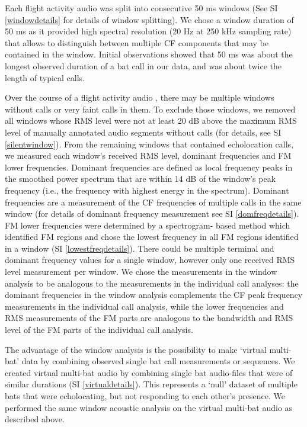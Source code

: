 \documentclass[
]{book}
\begin{document}
Each flight activity audio was split into consecutive 50 ms windows (See SI \ref{windowdetails} for details of window splitting). We chose a window duration of 50 ms as it provided high spectral resolution (20 Hz at 250 kHz sampling rate) that allows to distinguish between multiple CF components that may be contained in the window. Initial observations showed that 50 ms was about the longest observed duration of a bat call in our data, and was about twice the length of typical calls.

Over the course of a flight activity audio , there may be multiple windows without calls or very faint calls in them. To exclude those windows, we removed all windows whose RMS level were not at least 20 dB above the maximum RMS level of manually annotated audio segments without calls (for details, see SI \ref{silentwindow}). From the remaining windows that contained echolocation calls, we measured each window's received RMS level, dominant frequencies and FM lower frequencies. Dominant frequencies are defined as local frequency peaks in the smoothed power spectrum that are within 14 dB of the window's peak frequency (i.e., the frequency with highest energy in the spectrum). Dominant frequencies are a measurement of the CF frequencies of multiple calls in the same window (for details of dominant frequency measurement see SI \ref{domfreqdetails}). FM lower frequencies were determined by a spectrogram- based method which identified FM regions and chose the lowest frequency in all FM regions identified in a window (SI \ref{lowestfreqdetails}). There could be multiple terminal and dominant frequency values for a single window, however only one received RMS level measurement per window. We chose the measurements in the window analysis to be analogous to the measurements in the individual call analyses: the dominant frequencies in the window analysis complements the CF peak frequency measurements in the individual call analysis, while the lower frequencies and RMS measurements of the FM parts are analogous to the bandwidth and RMS level of the FM parts of the individual call analysis.

The advantage of the window analysis is the possibility to make `virtual multi-bat' data \citep{fawcett2015echolocation, ratcliffe2004conspecifics} by combining observed single bat call measurements or sequences. We created virtual multi-bat audio by combining single bat audio-files that were of similar durations (SI \ref{virtualdetails}). This represents a `null' dataset of multiple bats that were echolocating, but not responding to each other's presence. We performed the same window acoustic analysis on the virtual multi-bat audio as described above.
\end{document}
